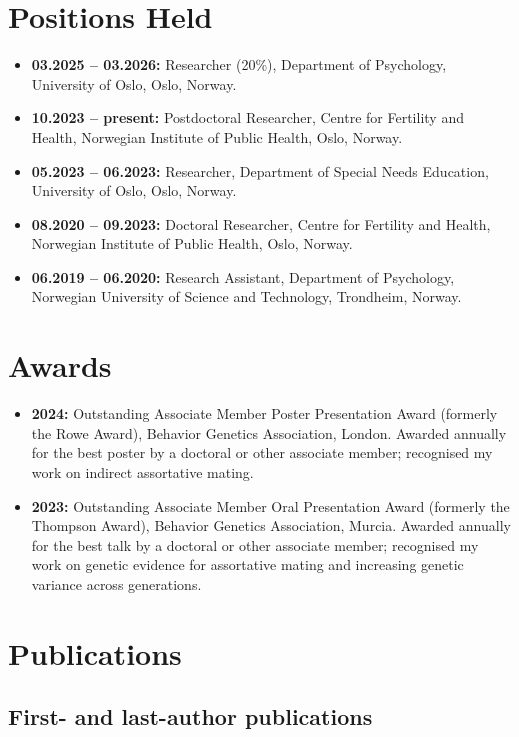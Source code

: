 \documentclass[10pt,a4paper]{article}
\begin{document}
\section*{Positions Held}
\begin{itemize}
\item \textbf{03.2025 -- 03.2026:} Researcher (20\%), Department of Psychology, University of Oslo, Oslo, Norway.
\item \textbf{10.2023 -- present:} Postdoctoral Researcher, Centre for Fertility and Health, Norwegian Institute of Public Health, Oslo, Norway.
\item \textbf{05.2023 -- 06.2023:} Researcher, Department of Special Needs Education, University of Oslo, Oslo, Norway.
\item \textbf{08.2020 -- 09.2023:} Doctoral Researcher, Centre for Fertility and Health, Norwegian Institute of Public Health, Oslo, Norway.
\item \textbf{06.2019 -- 06.2020:} Research Assistant, Department of Psychology, Norwegian University of Science and Technology, Trondheim, Norway.
\end{itemize}

\section*{Awards}
\begin{itemize}
\item \textbf{2024:} Outstanding Associate Member Poster Presentation Award (formerly the Rowe Award), Behavior Genetics Association, London. Awarded annually for the best poster by a doctoral or other associate member; recognised my work on indirect assortative mating.
\item \textbf{2023:} Outstanding Associate Member Oral Presentation Award (formerly the Thompson Award), Behavior Genetics Association, Murcia. Awarded annually for the best talk by a doctoral or other associate member; recognised my work on genetic evidence for assortative mating and increasing genetic variance across generations.
\end{itemize}

\newpage
\section*{Publications}
\subsection*{First- and last-author publications}
\end{document}
